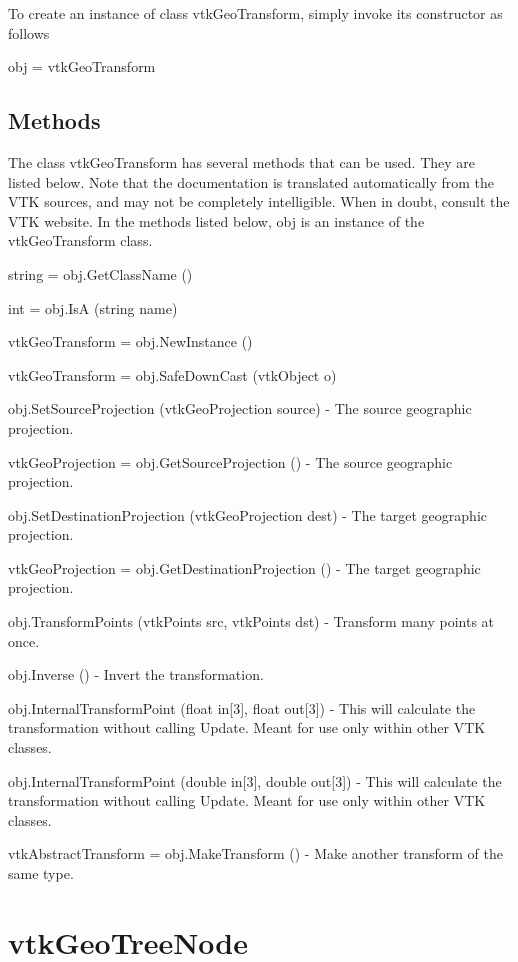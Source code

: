 To create an instance of class vtk\-Geo\-Transform, simply invoke its constructor as follows \begin{DoxyVerb}  obj = vtkGeoTransform
\end{DoxyVerb}
 \hypertarget{vtkwidgets_vtkxyplotwidget_Methods}{}\subsection{Methods}\label{vtkwidgets_vtkxyplotwidget_Methods}
The class vtk\-Geo\-Transform has several methods that can be used. They are listed below. Note that the documentation is translated automatically from the V\-T\-K sources, and may not be completely intelligible. When in doubt, consult the V\-T\-K website. In the methods listed below, {\ttfamily obj} is an instance of the vtk\-Geo\-Transform class. 
\begin{DoxyItemize}
\item {\ttfamily string = obj.\-Get\-Class\-Name ()}  
\item {\ttfamily int = obj.\-Is\-A (string name)}  
\item {\ttfamily vtk\-Geo\-Transform = obj.\-New\-Instance ()}  
\item {\ttfamily vtk\-Geo\-Transform = obj.\-Safe\-Down\-Cast (vtk\-Object o)}  
\item {\ttfamily obj.\-Set\-Source\-Projection (vtk\-Geo\-Projection source)} -\/ The source geographic projection.  
\item {\ttfamily vtk\-Geo\-Projection = obj.\-Get\-Source\-Projection ()} -\/ The source geographic projection.  
\item {\ttfamily obj.\-Set\-Destination\-Projection (vtk\-Geo\-Projection dest)} -\/ The target geographic projection.  
\item {\ttfamily vtk\-Geo\-Projection = obj.\-Get\-Destination\-Projection ()} -\/ The target geographic projection.  
\item {\ttfamily obj.\-Transform\-Points (vtk\-Points src, vtk\-Points dst)} -\/ Transform many points at once.  
\item {\ttfamily obj.\-Inverse ()} -\/ Invert the transformation.  
\item {\ttfamily obj.\-Internal\-Transform\-Point (float in\mbox{[}3\mbox{]}, float out\mbox{[}3\mbox{]})} -\/ This will calculate the transformation without calling Update. Meant for use only within other V\-T\-K classes.  
\item {\ttfamily obj.\-Internal\-Transform\-Point (double in\mbox{[}3\mbox{]}, double out\mbox{[}3\mbox{]})} -\/ This will calculate the transformation without calling Update. Meant for use only within other V\-T\-K classes.  
\item {\ttfamily vtk\-Abstract\-Transform = obj.\-Make\-Transform ()} -\/ Make another transform of the same type.  
\end{DoxyItemize}\hypertarget{vtkgeovis_vtkgeotreenode}{}\section{vtk\-Geo\-Tree\-Node}\label{vtkgeovis_vtkgeotreenode}
